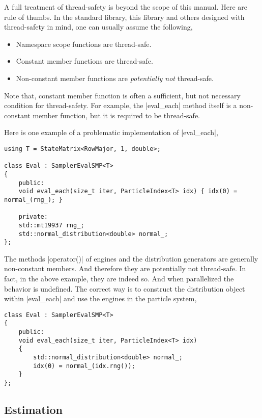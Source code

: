 A full treatment of thread-safety is beyond the scope of this manual. Here are
rule of thumbs. In the standard library, this library and others designed with
thread-safety in mind, one can usually assume the following,
\begin{itemize}
  \item Namespace scope functions are thread-safe.
  \item Constant member functions are thread-safe.
  \item Non-constant member functions are \emph{potentially not} thread-safe.
\end{itemize}
Note that, constant member function is often a sufficient, but not necessary
condition for thread-safety. For example, the |eval_each| method itself is a
non-constant member function, but it is required to be thread-safe.

Here is one example of a problematic implementation of |eval_each|,
\begin{verbatim}
using T = StateMatrix<RowMajor, 1, double>;

class Eval : SamplerEvalSMP<T>
{
    public:
    void eval_each(size_t iter, ParticleIndex<T> idx) { idx(0) = normal_(rng_); }

    private:
    std::mt19937 rng_;
    std::normal_distribution<double> normal_;
};
\end{verbatim}
The methods |operator()| of \rng engines and the distribution generators are
generally non-constant members. And therefore they are potentially not
thread-safe. In fact, in the above example, they are indeed so. And when
parallelized the behavior is undefined. The correct way is to construct the
distribution object within |eval_each| and use the \rng engines in the particle
system,
\begin{verbatim}
class Eval : SamplerEvalSMP<T>
{
    public:
    void eval_each(size_t iter, ParticleIndex<T> idx)
    {
        std::normal_distribution<double> normal_;
        idx(0) = normal_(idx.rng());
    }
};
\end{verbatim}

\subsection{Estimation}
\label{sub:Estimation}

